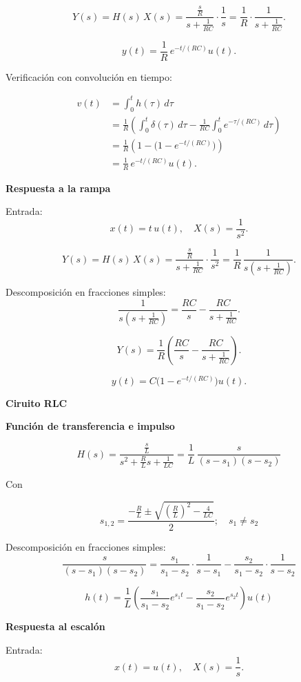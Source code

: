 \[
Y(s) = H(s)\,X(s) 
= \frac{\tfrac{s}{R}}{s+\tfrac{1}{RC}} \cdot \frac{1}{s}
= \frac{1}{R}\cdot \frac{1}{s+\tfrac{1}{RC}}.
\]

\[
y(t) = \frac{1}{R}\,e^{-t/(RC)}u(t).
\]

Verificación con convolución en tiempo:

\begin{align*}
v(t) &= \int_{0}^{t} h(\tau)\,d\tau \\
     &= \frac{1}{R}\left( \int_{0}^{t}\delta(\tau)\,d\tau 
     - \frac{1}{RC}\int_{0}^{t} e^{-\tau/(RC)}\,d\tau \right) \\
     &= \frac{1}{R}\left(1 - \big(1-e^{-t/(RC)}\big)\right) \\
     &= \frac{1}{R}\,e^{-t/(RC)}u(t).
\end{align*}

\textbf{Respuesta a la rampa}

Entrada:
\[
x(t)=t\,u(t), \quad X(s)=\frac{1}{s^2}.
\]

\[
Y(s) = H(s)\,X(s) 
= \frac{\tfrac{s}{R}}{s+\tfrac{1}{RC}} \cdot \frac{1}{s^2}
= \frac{1}{R}\,\frac{1}{s(s+\tfrac{1}{RC})}.
\]

Descomposición en fracciones simples:
\[
\frac{1}{s(s+\tfrac{1}{RC})} = \frac{RC}{s} - \frac{RC}{s+\tfrac{1}{RC}}.
\]

\[
Y(s)=\frac{1}{R}\left(\frac{RC}{s}-\frac{RC}{s+\tfrac{1}{RC}}\right).
\]

\[
y(t) = C\big(1-e^{-t/(RC)}\big)u(t).
\]

\textbf{Ciruito RLC}

\textbf{Función de transferencia e impulso}

\[
H(s) = \frac{\tfrac{s}{L}}{s^2+\tfrac{R}{L}s+\tfrac{1}{LC}}
= \frac{1}{L}\,\frac{s}{(s-s_1)(s-s_2)}
\]

Con

\[
s_{1,2} = \frac{-\tfrac{R}{L}\pm \sqrt{\left(\tfrac{R}{L}\right)^2-\tfrac{4}{LC}}}{2} ; 
\quad s_1 \neq s_2
\]

Descomposición en fracciones simples:
\[
\frac{s}{(s-s_1)(s-s_2)}
=\frac{s_1}{s_1-s_2}\cdot\frac{1}{s-s_1}
-\frac{s_2}{s_1-s_2}\cdot\frac{1}{s-s_2}
\]

\[
h(t)=\frac{1}{L}\left(\frac{s_1}{s_1-s_2}e^{s_1 t}
-\frac{s_2}{s_1-s_2}e^{s_2 t}\right)u(t)
\]

\textbf{Respuesta al escalón}

Entrada:
\[
x(t)=u(t), \quad X(s)=\frac{1}{s}.
\]

